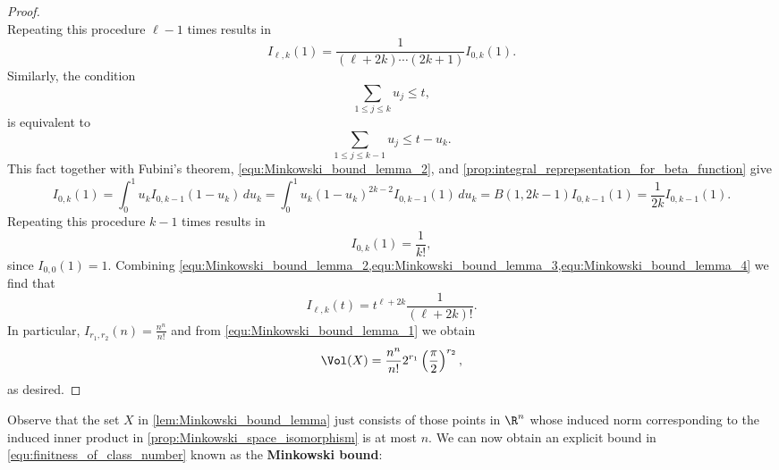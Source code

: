 \begin{proof}
\[      \]
      Repeating this procedure $\ell-1$ times results in
      \begin{equation}\label{equ:Minkowski_bound_lemma_3}
        I_{\ell,k}(1) = \frac{1}{(\ell+2k) \cdots (2k+1)}I_{0,k}(1).
      \end{equation}
      Similarly, the condition
      \[
        \sum_{1 \le j \le k}u_{j} \le t,
      \]
      is equivalent to
      \[
        \sum_{1 \le j \le k-1}u_{j} \le t-u_{k}.
      \]
      This fact together with Fubini's theorem, \cref{equ:Minkowski_bound_lemma_2}, and \cref{prop:integral_reprepsentation_for_beta_function} give
      \[
        I_{0,k}(1) = \int_{0}^{1}u_{k}I_{0,k-1}(1-u_{k})\,du_{k} = \int_{0}^{1}u_{k}(1-u_{k})^{2k-2}I_{0,k-1}(1)\,du_{k} = B(1,2k-1)I_{0,k-1}(1) = \frac{1}{2k}I_{0,k-1}(1).
      \]
      Repeating this procedure $k-1$ times results in
      \begin{equation}\label{equ:Minkowski_bound_lemma_4}
        I_{0,k}(1) = \frac{1}{k!},
      \end{equation}
      since $I_{0,0}(1) = 1$. Combining \cref{equ:Minkowski_bound_lemma_2,equ:Minkowski_bound_lemma_3,equ:Minkowski_bound_lemma_4} we find that
      \[
        I_{\ell,k}(t) = t^{\ell+2k}\frac{1}{(\ell+2k)!}.
      \]
      In particular, $I_{r_{1},r_{2}}(n) = \frac{n^{n}}{n!}$ and from \cref{equ:Minkowski_bound_lemma_1} we obtain
      \[
        \Vol(X) = \frac{n^{n}}{n!}2^{r_{1}}\left(\frac{\pi}{2}\right)^{r_{2}},
      \]
      as desired.
    \end{proof}

    Observe that the set $X$ in \cref{lem:Minkowski_bound_lemma} just consists of those points in $\R^{n}$ whose induced norm corresponding to the induced inner product in \cref{prop:Minkowski_space_isomorphism} is at most $n$. We can now obtain an explicit bound in \cref{equ:finitness_of_class_number} known as the \textbf{Minkowski bound}:

